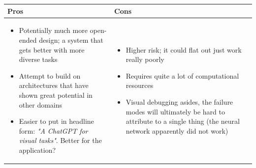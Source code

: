 \documentclass{article}
\begin{document}
\begin{center}
\begin{tabular}{|p{.45\linewidth}|p{.45\linewidth}|}
\hline
\textbf{Pros} & \textbf{Cons} \\
\hline
\begin{itemize}
    \item Potentially much more open-ended design; a system that gets better with more diverse tasks
    \item Attempt to build on architectures that have shown great potential in other domains
    \item Easier to put in headline form: \emph{"A ChatGPT for visual tasks"}. Better for the application?
\end{itemize} &
\begin{itemize}
    \item Higher risk; it could flat out just work really poorly
    \item Requires quite a lot of computational resources
    \item Visual debugging asides, the failure modes will ultimately be hard to attribute to a single thing (the neural network apparently did not work)
\end{itemize} \\
\hline
\end{tabular}
\end{center}




\end{document}
